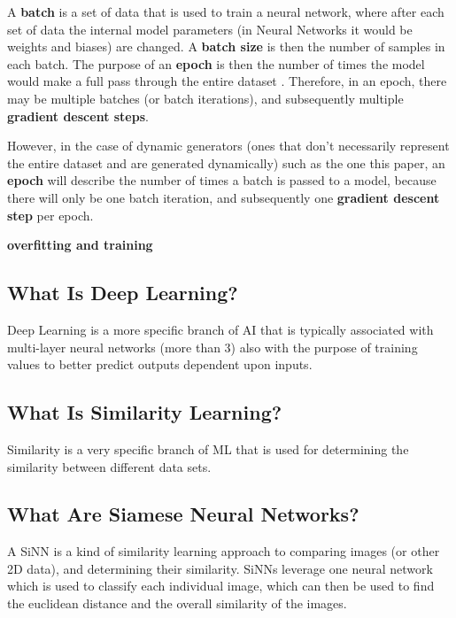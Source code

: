 \documentclass[
	letterpaper, %
	10pt, %
	unnumberedsections, %
	twoside, %
]{LTJournalArticle}
\begin{document}
A \textbf{batch} is a set of data that is used to train a neural network, where after each set of data the internal model parameters (in Neural Networks it would be weights and biases) are changed. A \textbf{batch size} is then the number of samples in each batch. The purpose of an \textbf{epoch} is then the number of times the model would make a full pass through the entire dataset \autocite{brownlee}.
Therefore, in an epoch, there may be multiple batches (or batch iterations), and subsequently multiple \textbf{gradient descent steps}.

However, in the case of dynamic generators (ones that don't necessarily represent the entire dataset and are generated dynamically) such as the one this paper, an \textbf{epoch} will describe the number of times a batch is passed to a model, because there will only be one batch iteration, and subsequently one \textbf{gradient descent step} per epoch.

\textbf{overfitting and training}

\subsection{What Is Deep Learning?}
Deep Learning is a more specific branch of AI that is typically associated with multi-layer neural networks (more than 3) also with the purpose of training values to better predict outputs dependent upon inputs.

\subsection{What Is Similarity Learning?}
Similarity is a very specific branch of ML that is used for determining the similarity between different data sets\autocite{what_is_similarity_learning}.

\subsection{What Are Siamese Neural Networks?}
A SiNN is a kind of similarity learning approach to comparing images (or other 2D data), and determining their similarity. SiNNs leverage one neural network which is used to classify each individual image, which can then be used to find the euclidean distance and the overall similarity of the images.
\end{document}
